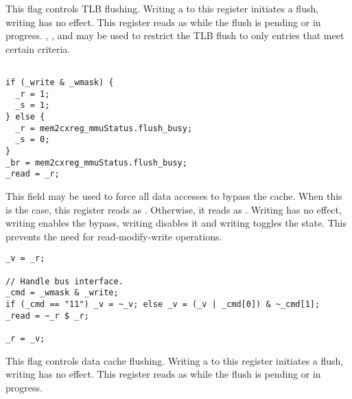 This flag controls TLB flushing. Writing a  to this register initiates a
flush, writing  has no effect. This register reads as  while the
flush is pending or in progress. , , and  may
be used to restrict the TLB flush to only entries that meet certain criteria.

\declaration{}
\implementation{}
\begin{lstlisting}

if (_write & _wmask) {
  _r = 1;
  _s = 1;
} else {
  _r = mem2cxreg_mmuStatus.flush_busy;
  _s = 0;
}
_br = mem2cxreg_mmuStatus.flush_busy;
_read = _r;

\end{lstlisting}

This field may be used to force all data accesses to bypass the cache. When this 
is the case, this register reads as . Otherwise, it reads as . 
Writing  has no effect, writing  enables the bypass, writing 
 disables it and writing  toggles the state. This prevents the 
need for read-modify-write operations.

\declaration{}
\implementation{}
\begin{lstlisting}
_v = _r;

// Handle bus interface.
_cmd = _wmask & _write;
if (_cmd == "11") _v = ~_v; else _v = (_v | _cmd[0]) & ~_cmd[1];
_read = ~_r $ _r;

_r = _v;
\end{lstlisting}

This flag controls data cache flushing. Writing a  to this register 
initiates a flush, writing  has no effect. This register reads as 
 while the flush is pending or in progress.

